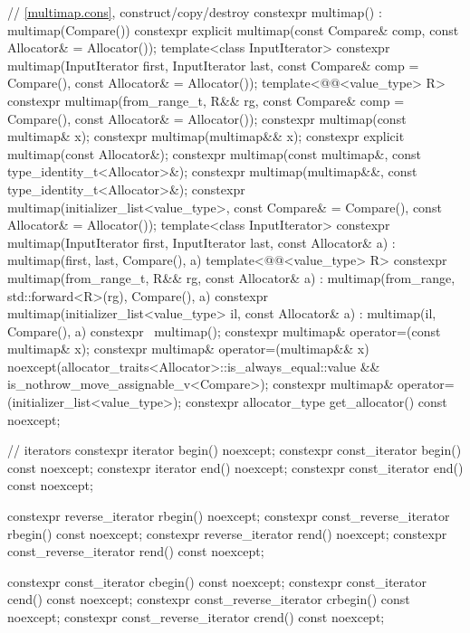 \begin{codeblock}
{{    // \ref{multimap.cons}, construct/copy/destroy
    constexpr multimap() : multimap(Compare()) { }
    constexpr explicit multimap(const Compare& comp, const Allocator& = Allocator());
    template<class InputIterator>
      constexpr multimap(InputIterator first, InputIterator last,
                         const Compare& comp = Compare(), const Allocator& = Allocator());
    template<@@<value_type> R>
      constexpr multimap(from_range_t, R&& rg,
                         const Compare& comp = Compare(), const Allocator& = Allocator());
    constexpr multimap(const multimap& x);
    constexpr multimap(multimap&& x);
    constexpr explicit multimap(const Allocator&);
    constexpr multimap(const multimap&, const type_identity_t<Allocator>&);
    constexpr multimap(multimap&&, const type_identity_t<Allocator>&);
    constexpr multimap(initializer_list<value_type>,
                       const Compare& = Compare(), const Allocator& = Allocator());
    template<class InputIterator>
      constexpr multimap(InputIterator first, InputIterator last, const Allocator& a)
        : multimap(first, last, Compare(), a) { }
    template<@@<value_type> R>
      constexpr multimap(from_range_t, R&& rg, const Allocator& a)
        : multimap(from_range, std::forward<R>(rg), Compare(), a) { }
    constexpr multimap(initializer_list<value_type> il, const Allocator& a)
      : multimap(il, Compare(), a) { }
    constexpr ~multimap();
    constexpr multimap& operator=(const multimap& x);
    constexpr multimap& operator=(multimap&& x)
      noexcept(allocator_traits<Allocator>::is_always_equal::value &&
               is_nothrow_move_assignable_v<Compare>);
    constexpr multimap& operator=(initializer_list<value_type>);
    constexpr allocator_type get_allocator() const noexcept;

    // iterators
    constexpr iterator               begin() noexcept;
    constexpr const_iterator         begin() const noexcept;
    constexpr iterator               end() noexcept;
    constexpr const_iterator         end() const noexcept;

    constexpr reverse_iterator       rbegin() noexcept;
    constexpr const_reverse_iterator rbegin() const noexcept;
    constexpr reverse_iterator       rend() noexcept;
    constexpr const_reverse_iterator rend() const noexcept;

    constexpr const_iterator         cbegin() const noexcept;
    constexpr const_iterator         cend() const noexcept;
    constexpr const_reverse_iterator crbegin() const noexcept;
    constexpr const_reverse_iterator crend() const noexcept;

}}
\end{codeblock}
